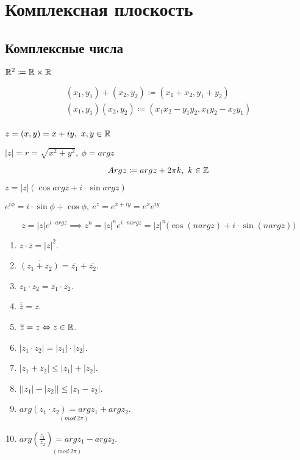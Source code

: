 

\section{Комплексная плоскость}

\subsection{Комплексные числа}

\begin{note}
    $ \mathbb{R}^2 \coloneqq \mathbb{R} \times \mathbb{R} $

    \[
        \begin{array}{l}
            (x_1,y_1) + (x_2,y_2) \coloneqq (x_1 + x_2, y_1 + y_2)          \\
            (x_1,y_1)(x_2,y_2) \coloneqq (x_1x_2 - y_1y_2, x_1y_2 - x_2y_1) \\
        \end{array}
    \]

    $ z = (x,y) = x+iy, \  x,y \in \mathbb{R} $

    $ | z | = r = \sqrt{x^2 + y^2}, \ \phi = arg z $

    \[
        Argz \coloneqq argz + 2\pi k, \ k \in \mathbb{Z}
    \]

    $ z = | z | (\cos argz + i\cdot \sin argz) $

    $ e^{i\phi} = i \cdot \sin\phi + \cos\phi, \ e^z = e^{x + iy} = e^xe^{iy} $

    \[
        z = | z | e^{i\cdot argz} \implies z^n = | z |^n e^{i\cdot n arg z} = | z |^n\bigl(\cos(nargz) + i\cdot\sin(nargz)\bigr)
    \]
\end{note}

\begin{theorem}\leavevmode
    \begin{multicols}{2}
        \begin{enumerate}
            \item $ z \cdot \overline{z} = | z |^2  $.
            \item $ \overline{(z_1 + z_2)} = \overline{z_1} + \overline{z_2} $.
            \item $ \overline{z_1 \cdot z_2} = \overline{z_1} \cdot \overline{z_2} $.
            \item $ \overline{\overline{z}} = z $.
            \item $ \overline{z} = z \Leftrightarrow z \in \mathbb{R} $.
            \item $ | z_1 \cdot z_2 | = | z_1 | \cdot | z_2 | $.
            \item $ | z_1 + z_2 | \leqslant | z_1 | + | z_2 | $.
            \item $ \big|| z_1 | - | z_2 |\big| \leqslant | z_1 - z_2 | $.
            \item $ \underset{(mod \ 2\pi)}{arg(z_1 \cdot z_2) = argz_1 + argz_2} $.
            \item $ \underset{(mod \ 2\pi)}{arg\left(\frac{z_1}{z_2}\right) = argz_1 - argz_2} $.
        \end{enumerate}
    \end{multicols}
\end{theorem}

